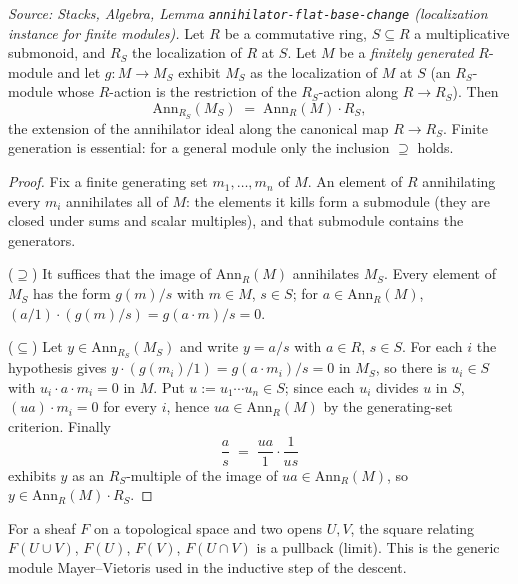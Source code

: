 \begin{lemma}
  \label{mk-lem:annihilator_localization_eq_map}
  \leanok

  \textit{Source: Stacks, Algebra, Lemma \texttt{annihilator-flat-base-change}
  (localization instance for finite modules).}
  Let \(R\) be a commutative ring, \(S \subseteq R\) a multiplicative submonoid, and
  \(R_S\) the localization of \(R\) at \(S\). Let \(M\) be a \emph{finitely
  generated} \(R\)-module and let \(g : M \to M_S\) exhibit \(M_S\) as the
  localization of \(M\) at \(S\) (an \(R_S\)-module whose \(R\)-action is the
  restriction of the \(R_S\)-action along \(R \to R_S\)). Then
  \[
    \mathrm{Ann}_{R_S}(M_S) \;=\; \mathrm{Ann}_R(M) \cdot R_S,
  \]
  the extension of the annihilator ideal along the canonical map
  \(R \to R_S\). Finite generation is essential: for a general module only the
  inclusion \(\supseteq\) holds.
\end{lemma}
\begin{proof}
  \leanok
  Fix a finite generating set \(m_1, \dots, m_n\) of \(M\). An element of \(R\)
  annihilating every \(m_i\) annihilates all of \(M\): the elements it kills form
  a submodule (they are closed under sums and scalar multiples), and that
  submodule contains the generators.

  (\(\supseteq\)) It suffices that the image of \(\mathrm{Ann}_R(M)\)
  annihilates \(M_S\). Every element of \(M_S\) has the form \(g(m)/s\) with
  \(m \in M\), \(s \in S\); for \(a \in \mathrm{Ann}_R(M)\),
  \((a/1)\cdot(g(m)/s) = g(a \cdot m)/s = 0\).

  (\(\subseteq\)) Let \(y \in \mathrm{Ann}_{R_S}(M_S)\) and write \(y = a/s\)
  with \(a \in R\), \(s \in S\). For each \(i\) the hypothesis gives
  \(y \cdot (g(m_i)/1) = g(a \cdot m_i)/s = 0\) in \(M_S\), so there is
  \(u_i \in S\) with \(u_i \cdot a \cdot m_i = 0\) in \(M\). Put
  \(u := u_1 \cdots u_n \in S\); since each \(u_i\) divides \(u\) in \(S\),
  \((u a) \cdot m_i = 0\) for every \(i\), hence
  \(u a \in \mathrm{Ann}_R(M)\) by the generating-set criterion. Finally
  \[
    \frac{a}{s} \;=\; \frac{ua}{1} \cdot \frac{1}{us}
  \]
  exhibits \(y\) as an \(R_S\)-multiple of the image of
  \(ua \in \mathrm{Ann}_R(M)\), so \(y \in \mathrm{Ann}_R(M) \cdot R_S\).
\end{proof}


\begin{lemma}
  \label{mk-lem:isLimitPullbackCone_mathlib}
  \mathlibok

  For a sheaf \(F\) on a topological space and two opens \(U, V\), the square relating
  \(F(U \cup V)\), \(F(U)\), \(F(V)\), \(F(U \cap V)\) is a pullback (limit). This is the generic
  module Mayer--Vietoris used in the inductive step of the descent.
\end{lemma}



